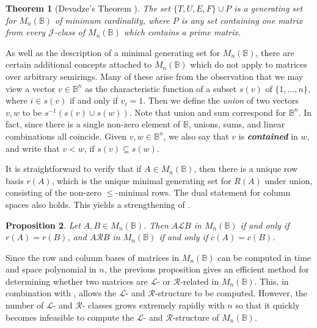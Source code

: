 \documentclass[11pt]{article}
\newtheorem{thm}{Theorem}[section]
\newtheorem{prop}[thm]{Proposition}
\newcommand{\defn}[1]{\textbf{\textit{#1}}}
\numberwithin{equation}{section}
\newcommand{\B}{\mathbb{B}}
\newcommand{\Bn}{M_n(\B)}
\renewcommand{\L}{\mathscr{L}}
\newcommand{\R}{\mathscr{R}}
\newcommand{\J}{\mathscr{J}}
\begin{document}
\begin{thm}[Devadze's Theorem \cite{Konieczny2011aa}]
  The set $\{T, U, E, F\} \cup P$ is a generating set for $\Bn$ of minimum
  cardinality, where $P$ is any set containing one matrix from every $\J$-class
  of $\Bn$ which contains a prime matrix. 
\end{thm}

As well as the description of a minimal generating set for $\Bn$, there are
certain additional concepts attached to $\Bn$ which do not apply to matrices
over arbitrary semirings. Many of these arise from the observation that we may
view a vector $v \in \B^n$ as the characteristic function of a subset $s(v)$ of
$\{1, \ldots, n\}$, where $i \in s(v)$ if and only if $v_i = 1$.  Then we define
the \emph{union} of two vectors $v, w$ to be $s^{-1}(s(v) \cup s(w))$. Note that
union and sum correspond for $\B^n$. In fact, since there is a single non-zero
element of $\B$, unions, sums, and linear combinations all coincide. Given $v, w
\in \B^n$, we also say that $v$ is \defn{contained} in $w$, and write that $v <
w$, if $s(v) \subseteq s(w)$.

It is straightforward to verify that if $A \in \Bn$, then there is a unique row
basis $r(A)$, which is the unique minimal generating set for $R(A)$ under union,
consisting of the non-zero $\leq$-minimal rows. The dual statement for column
spaces also holds. This yields a strengthening of
.

\begin{prop} 
  Let $A, B \in \Bn$. Then $A \L B$ in $\Bn$ if and only if $r(A) = r(B)$,
  and $A \R B$ in $\Bn$ if and only if $c(A) = c(B)$.
\end{prop}
Since the row and column bases of matrices in $\Bn$ can be computed in time and
space polynomial in $n$, the previous proposition gives an efficient method for
determining whether two matrices are $\L$- or $\R$-related in $\Bn$. This, in
combination with , allows the $\L$- and
$\R$-structure to be computed. However, the number of $\L$- and $\R$- classes
grows extremely rapidly with $n$ so that it quickly becomes infeasible to
compute the $\L$- and $\R$-structure of $\Bn$.

\end{document}
